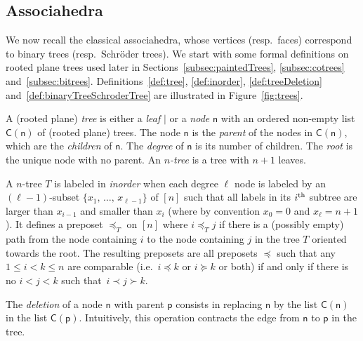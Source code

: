 \documentclass[AHL,Unicode,longabstracts,published]{cedram}
\newcommand{\ie}{i.e.~}
\newcommand{\children}{\mathsf{C}}
\newcommand{\node}[1]{\mathsf{#1}}
\begin{document}
\subsection{Associahedra}\label{subsec:associahedra}

We now recall the classical associahedra, whose vertices (resp.~faces) correspond to binary trees (resp.~Schr\"oder trees). We start with some formal definitions on rooted plane trees used later in Sections~\ref{subsec:paintedTrees}, \ref{subsec:cotrees} and~\ref{subsec:bitrees}. Definitions~\ref{def:tree}, \ref{def:inorder}, \ref{def:treeDeletion} and~\ref{def:binaryTreeSchroderTree} are illustrated in Figure~\ref{fig:trees}.

\begin{defi}\label{def:tree}
A (rooted plane)
\emph{tree} is either a
\emph{leaf} $|$ or a
\emph{node} $\node{n}$ with an ordered non-empty list $\children(\node{n})$ of (rooted plane) trees. The node $\node{n}$ is the
\emph{parent} of the nodes in $\children(\node{n})$, which are the
\emph{children} of $\node{n}$. The
\emph{degree} of $\node{n}$ is its number of children. The
\emph{root} is the unique node with no parent. An
\emph{$n$-tree} is a tree with $n+1$ leaves.
\end{defi}

\begin{defi}\label{def:inorder}
A $n$-tree $T$ is labeled in
\emph{inorder} when each degree $\ell$ node is labeled by an $(\ell-1)$-subset $\{x_1,\,\dots,\, x_{\ell-1}\}$ of $[n]$ such that all labels in its $i^{\rm th}$ subtree are larger than $x_{i-1}$ and smaller than $x_i$ (where by convention $x_0 = 0$ and $x_\ell = n+1$). It defines a preposet $\preccurlyeq_T$ on $[n]$ where $i \preccurlyeq_T j$ if there is a (possibly empty) path from the node containing $i$ to the node containing $j$ in the tree $T$ oriented towards the root. The resulting preposets are all preposets $\preccurlyeq$ such that any $1 \le i < k \le n$ are comparable (\ie $i \preccurlyeq k$ or $i \succcurlyeq k$ or both) if and only if there is no $i < j < k$ such that~$i \prec j \succ k$.
\end{defi}

\begin{defi}\label{def:treeDeletion}
The
\emph{deletion} of a node $\node{n}$ with parent $\node{p}$ consists in replacing $\node{n}$ by the list $\children(\node{n})$ in the list $\children(\node{p})$. Intuitively, this operation contracts the edge from $\node{n}$ to $\node{p}$ in the tree.
\end{defi}
\end{document}
